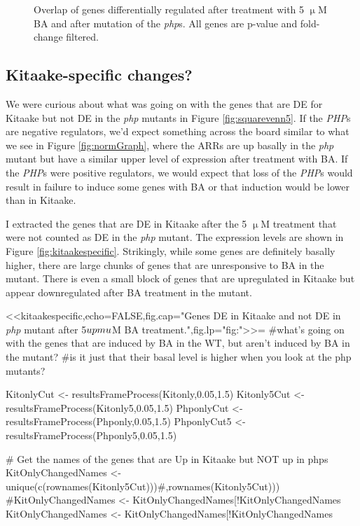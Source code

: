 \documentclass{article}
\begin{document}
{{{{\begin{figure}
	\caption{Overlap of genes differentially regulated after treatment with 5 $\upmu$M BA and after mutation of the \textit{php}s. All genes are p-value and fold-change filtered.}
	\label{fig:5uMmutoverlap}
\end{figure}

\subsection{Kitaake-specific changes?}
We were curious about what was going on with the genes that are DE for Kitaake but not DE in the \textit{php} mutants in Figure \ref{fig:squarevenn5}. If the \textit{PHP}s are negative regulators, we'd expect something across the board similar to what we see in Figure \ref{fig:normGraph}, where the ARRs are up basally in the \textit{php} mutant but have a similar upper level of expression after treatment with BA. If the \textit{PHP}s were positive regulators, we would expect that loss of the \textit{PHP}s would result in failure to induce some genes with BA or that induction would be lower than in Kitaake.

I extracted the genes that are DE in Kitaake after the 5 $\upmu$M treatment that were not counted as DE in the \textit{php} mutant. The expression levels are shown in Figure \ref{fig:kitaakespecific}.
Strikingly, while some genes are definitely basally higher, there are large chunks of genes that are unresponsive to BA in the mutant. There is even a small block of genes that are upregulated in Kitaake but appear downregulated after BA treatment in the mutant.

<<kitaakespecific,echo=FALSE,fig.cap="Genes DE in Kitaake and not DE in \textit{php} mutant after 5$\\upmu$M BA treatment.",fig.lp="fig:">>=
#what's going on with the genes that are induced by BA in the WT, but aren't induced by BA in the mutant?
#is it just that their basal level is higher when you look at the php mutants?

KitonlyCut <- resultsFrameProcess(Kitonly,0.05,1.5)
Kitonly5Cut <- resultsFrameProcess(Kitonly5,0.05,1.5)
PhponlyCut <- resultsFrameProcess(Phponly,0.05,1.5)
PhponlyCut5 <- resultsFrameProcess(Phponly5,0.05,1.5)

# Get the names of the genes that are Up in Kitaake but NOT up in phps
KitOnlyChangedNames <- unique(c(rownames(Kitonly5Cut)))#,rownames(Kitonly5Cut)))
#KitOnlyChangedNames <- KitOnlyChangedNames[!KitOnlyChangedNames %
KitOnlyChangedNames <- KitOnlyChangedNames[!KitOnlyChangedNames %

}}}}
\end{document}
